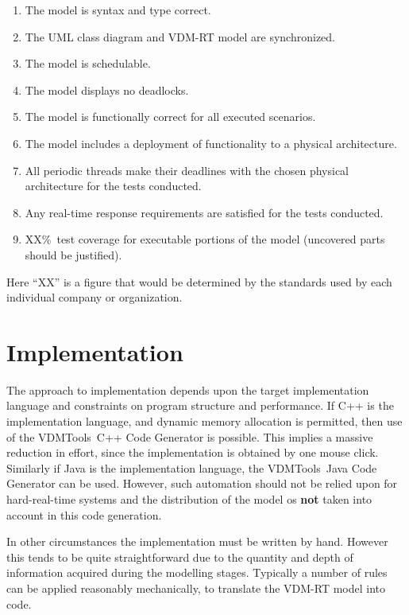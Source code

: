 \documentclass{overturerepchap}
\newcommand{\VDMTools}{VDMTools}
\begin{document}
\begin{enumerate}
\item The model is syntax and type correct.
\item The UML class diagram and VDM-RT model are synchronized.
\item The model is schedulable.
\item The model displays no deadlocks.
\item The model is functionally correct for all executed scenarios.
\item The model includes a deployment of functionality to a physical
      architecture.
\item All periodic threads make their deadlines with the chosen physical
      architecture for the tests conducted.
\item Any real-time response requirements are satisfied for the tests
conducted.
\item XX\%\ test coverage for executable portions of the model
(uncovered parts should be justified).
\end{enumerate}

Here ``XX'' is a figure that would be determined by the standards used
by each individual company or organization.

\section{Implementation}

The approach to implementation depends upon the target implementation
language and constraints on program structure and performance. If C++
is the implementation language, and dynamic memory allocation is
permitted, then use of the \VDMTools\ C++ Code Generator is possible. This
implies a massive reduction in effort, since the implementation is
obtained by one mouse click. Similarly if Java is the implementation
language, the \VDMTools\ Java Code Generator can be used. However, such
automation should not be relied upon for hard-real-time systems and
the distribution of the model os {\bf not} taken into account in this
code generation.

In other circumstances the implementation must be written by
hand. However this tends to be quite straightforward due to the
quantity and depth of information acquired during the modelling
stages. Typically a number of rules can be applied reasonably
mechanically, to translate the VDM-RT model into code. 
\end{document}
